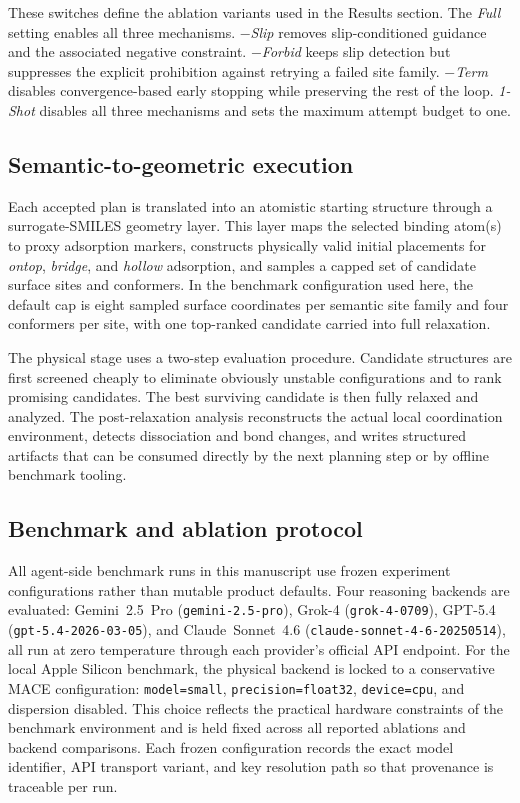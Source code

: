 These switches define the ablation variants used in the Results section. The \textit{Full} setting enables all three mechanisms. \textit{$-$Slip} removes slip-conditioned guidance and the associated negative constraint. \textit{$-$Forbid} keeps slip detection but suppresses the explicit prohibition against retrying a failed site family. \textit{$-$Term} disables convergence-based early stopping while preserving the rest of the loop. \textit{1-Shot} disables all three mechanisms and sets the maximum attempt budget to one.

\subsection{Semantic-to-geometric execution}

Each accepted plan is translated into an atomistic starting structure through a surrogate-SMILES geometry layer. This layer maps the selected binding atom(s) to proxy adsorption markers, constructs physically valid initial placements for \textit{ontop}, \textit{bridge}, and \textit{hollow} adsorption, and samples a capped set of candidate surface sites and conformers. In the benchmark configuration used here, the default cap is eight sampled surface coordinates per semantic site family and four conformers per site, with one top-ranked candidate carried into full relaxation.

The physical stage uses a two-step evaluation procedure. Candidate structures are first screened cheaply to eliminate obviously unstable configurations and to rank promising candidates. The best surviving candidate is then fully relaxed and analyzed. The post-relaxation analysis reconstructs the actual local coordination environment, detects dissociation and bond changes, and writes structured artifacts that can be consumed directly by the next planning step or by offline benchmark tooling.

\subsection{Benchmark and ablation protocol}

All agent-side benchmark runs in this manuscript use frozen experiment configurations rather than mutable product defaults. Four reasoning backends are evaluated: Gemini~2.5~Pro (\texttt{gemini-2.5-pro}), Grok-4 (\texttt{grok-4-0709}), GPT-5.4 (\texttt{gpt-5.4-2026-03-05}), and Claude~Sonnet~4.6 (\texttt{claude-sonnet-4-6-20250514}), all run at zero temperature through each provider's official API endpoint. For the local Apple Silicon benchmark, the physical backend is locked to a conservative MACE configuration: \texttt{model=small}, \texttt{precision=float32}, \texttt{device=cpu}, and dispersion disabled. This choice reflects the practical hardware constraints of the benchmark environment and is held fixed across all reported ablations and backend comparisons. Each frozen configuration records the exact model identifier, API transport variant, and key resolution path so that provenance is traceable per run.

